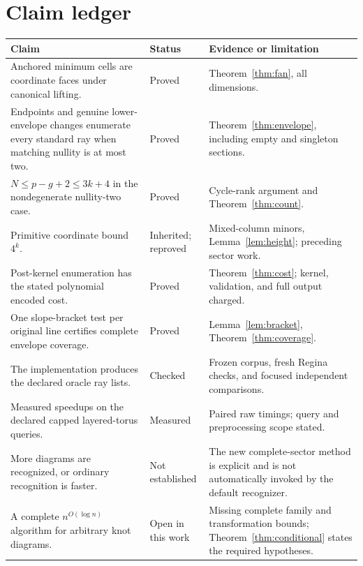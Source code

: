 \documentclass[11pt]{article}
\theoremstyle{definition}
\theoremstyle{remark}
\begin{document}
\clearpage
\section{Claim ledger}

{\small
\begin{longtable}{@{}>{\raggedright\arraybackslash}p{5.7cm}>{\raggedright\arraybackslash}p{2.7cm}>{\raggedright\arraybackslash}p{5.8cm}@{}}
\toprule
Claim & Status & Evidence or limitation\\
\midrule\endhead
Anchored minimum cells are coordinate faces under canonical lifting.
& Proved & Theorem~\ref{thm:fan}, all dimensions.\\
Endpoints and genuine lower-envelope changes enumerate every standard ray
when matching nullity is at most two.
& Proved & Theorem~\ref{thm:envelope}, including empty and singleton sections.\\
$N\le p-g+2\le3k+4$ in the nondegenerate nullity-two case.
& Proved & Cycle-rank argument and Theorem~\ref{thm:count}.\\
Primitive coordinate bound $4^k$.
& Inherited; reproved & Mixed-column minors, Lemma~\ref{lem:height}; preceding
sector work.\\
Post-kernel enumeration has the stated polynomial encoded cost.
& Proved & Theorem~\ref{thm:cost}; kernel, validation, and full output charged.\\
One slope-bracket test per original line certifies complete envelope coverage.
& Proved & Lemma~\ref{lem:bracket}, Theorem~\ref{thm:coverage}.\\
The implementation produces the declared oracle ray lists.
& Checked & Frozen corpus, fresh Regina checks, and focused
independent comparisons.\\
Measured speedups on the declared capped layered-torus queries.
& Measured & Paired raw timings; query and preprocessing scope stated.\\
More diagrams are recognized, or ordinary recognition is faster.
& Not established & The new complete-sector method is explicit and is not
automatically invoked by the default recognizer.\\
A complete $n^{O(\log n)}$ algorithm for arbitrary knot diagrams.
& Open in this work & Missing complete family and transformation bounds;
Theorem~\ref{thm:conditional} states the required hypotheses.\\
\bottomrule
\end{longtable}
}
\end{document}
